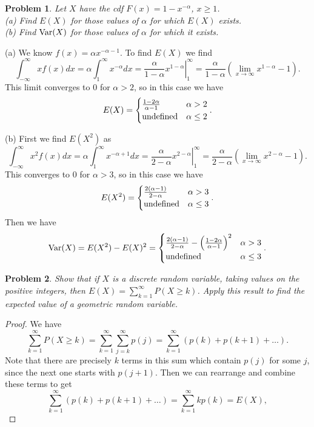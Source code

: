 \documentclass{article}
\newtheorem{problem}{Problem}
\newcommand{\var}{\textup{Var}}
\begin{document}
\begin{problem}
Let $X$ have the cdf $F(x) = 1 - x^{-\alpha}$, $x \geq 1$.\\
(a) Find $E(X)$ for those values of $\alpha$ for which $E(X)$ exists.\\
(b) Find $\var(X)$ for those values of $\alpha$ for which it exists.
\end{problem}
(a) We know $f(x) = \alpha x^{-\alpha - 1}$. To find $E(X)$ we find
\[
\int_{-\infty}^{\infty} xf(x)dx = \alpha \int_1^{\infty} x^{-\alpha} dx = \left. \frac{\alpha}{1 - \alpha} x^{1-\alpha} \right |_1^{\infty} = \frac{\alpha}{1 - \alpha} \left ( \lim_{x \rightarrow \infty} x^{1 - \alpha} - 1 \right ).
\]
This limit converges to $0$ for $\alpha > 2$, so in this case we have
\[
E(X) =
\begin{cases}
\frac{1 - 2 \alpha}{\alpha - 1} & \alpha > 2\\
\textup{undefined} & \alpha \leq 2
\end{cases}.
\]

(b) First we find $E(X^2)$ as
\[
\int_{-\infty}^{\infty} x^2 f(x)dx = \alpha \int_1^{\infty} x^{- \alpha + 1} dx = \left. \frac{\alpha}{2 - \alpha} x^{2 - \alpha} \right |_1^{\infty} = \frac{\alpha}{2- \alpha} \left ( \lim_{x \rightarrow \infty} x^{2 - \alpha} - 1 \right ).
\]
This converges to $0$ for $\alpha > 3$, so in this case we have
\[
E(X^2) =
\begin{cases}
\frac{2(\alpha - 1)}{2 - \alpha} & \alpha > 3\\
\textup{undefined} & \alpha \leq 3
\end{cases}.
\]
Then we have
\[
\var(X) = E(X^2) - E(X)^2 =
\begin{cases}
\frac{2(\alpha - 1)}{2 - \alpha} - \left ( \frac{1 - 2 \alpha}{\alpha - 1} \right )^2 & \alpha > 3\\
\textup{undefined} & \alpha \leq 3
\end{cases}.
\]

\begin{problem}
Show that if $X$ is a discrete random variable, taking values on the positive integers, then $E(X) = \sum_{k=1}^{\infty} P(X \geq k)$. Apply this result to find the expected value of a geometric random variable.
\end{problem}
\begin{proof}
We have
\[
\sum_{k=1}^{\infty} P(X \geq k) = \sum_{k=1}^{\infty} \sum_{j=k}^{\infty} p(j) = \sum_{k=1}^{\infty} (p(k) + p(k+1) + \dots ).
\]
Note that there are precisely $k$ terms in this sum which contain $p(j)$ for some $j$, since the next one starts with $p(j+1)$. Then we can rearrange and combine these terms to get
\[
\sum_{k=1}^{\infty} (p(k) + p(k+1) + \dots ) = \sum_{k=1}^{\infty} kp(k) = E(X),
\]
\end{proof}
\end{document}
